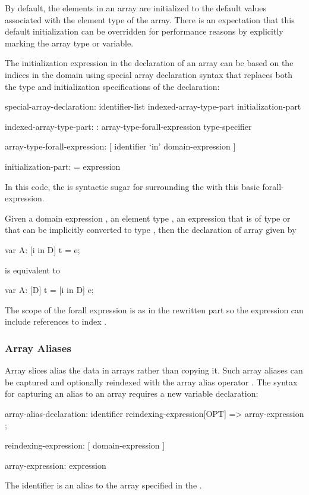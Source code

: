 By default, the elements in an array are initialized to the default
values associated with the element type of the array.  There is an
expectation that this default initialization can be overridden for
performance reasons by explicitly marking the array type or variable.

The initialization expression in the declaration of an array can be
based on the indices in the domain using special array declaration
syntax that replaces both the type and initialization specifications
of the declaration:
\begin{syntax}
special-array-declaration:
  identifier-list indexed-array-type-part initialization-part

indexed-array-type-part:
  : array-type-forall-expression type-specifier

array-type-forall-expression:
  [ identifier `in' domain-expression ]

initialization-part:
  = expression
\end{syntax}
In this code, the  is syntactic
sugar for surrounding the  with this basic
forall-expression.

Given a domain expression , an element type , an
expression  that is of type  or that can be implicitly
converted to type , then the declaration of array 
given by
\begin{chapel}
var A: [i in D] t = e;
\end{chapel}
is equivalent to
\begin{chapel}
var A: [D] t = [i in D] e;
\end{chapel}
The scope of the forall expression is as in the rewritten part so the
expression  can include references to index .

\subsubsection{Array Aliases}
\label{Array_Aliases}

Array slices alias the data in arrays rather than copying it.  Such
array aliases can be captured and optionally reindexed with the array
alias operator \chpl{=>}.  The syntax for capturing an alias to an
array requires a new variable declaration:
\begin{syntax}
array-alias-declaration:
  identifier reindexing-expression[OPT] => array-expression ;

reindexing-expression:
  [ domain-expression ]

array-expression:
  expression
\end{syntax}
The identifier is an alias to the array specified in
the .

